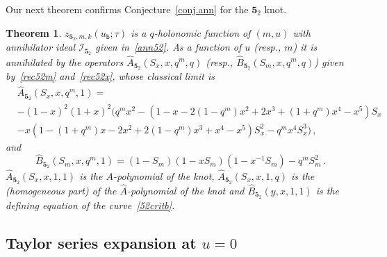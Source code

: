 \documentclass[12pt,reqno]{amsart}
\newtheorem{theorem}{Theorem}
\theoremstyle{definition}
\def\calI{\mathcal I}
\def\calI{\mathcal I}
\def\Ahat{\widehat{A}}
\def\Bhat{\widehat{B}}
\def\ub{u_{\mathsf{b}}}
\def\md{\mathbf}
\newcommand{\knot}[1]{\md{#1}}
\begin{document}
Our next theorem confirms Conjecture~\ref{conj.ann} for the $\knot{5}_2$
knot.

\begin{theorem}
  \label{thm.52c}
  \rm
  $z_{\knot{5}_2,m,k}(\ub;\tau)$ is a $q$-holonomic function of $(m,u)$
  with annihilator ideal $\calI_{\knot{5}_2}$ given in~\eqref{ann52}.
  As a function of $u$ (resp., $m$) it is annihilated by the operators
  $\Ahat_{\knot{5}_2}(S_x,x,q^m,q)$ (resp.,
  $\Bhat_{\knot{5}_2}(S_m,x,q^m,q)$) given by~\eqref{rec52m}
  and~\eqref{rec52x}, whose classical limit is
%
\begin{equation}
\begin{aligned}
  & \Ahat_{\knot{5}_2}(S_x,x,q^m,1) =\\
  &-(1-x)^2(1+x)^2
  \Big(q^mx^2-(1-x-2(1-q^m)x^2+2x^3+(1+q^m)x^4-x^5)S_x\\
  &-x(1-(1+q^m)x-2x^2+2(1-q^m)x^3+x^4-x^5)S_x^2-q^mx^4S_x^3\Big)\,,
\end{aligned}
\end{equation}
and
\begin{equation}
  \Bhat_{\knot{5}_2}(S_m,x,q^m,1) =
  (1-S_m)(1-xS_m)(1-x^{-1}S_m)-q^m S_m^2\,.
\end{equation}
$\Ahat_{\knot{5}_2}(S_x,x,1,1)$ is the $A$-polynomial of the knot,
$\Ahat_{\knot{5}_2}(S_x,x,1,q)$ is the (homogeneous part) of the
$\Ahat$-polynomial of the knot and $\Bhat_{\knot{5}_2}(y,x,1,1)$ is
the defining equation of the curve~\eqref{52critb}.
\end{theorem}

\subsection{Taylor series expansion at $u=0$}
\label{sub.52near1}
\end{document}
